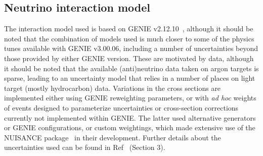 \subsection{Neutrino interaction model}
The interaction model used is based on GENIE v2.12.10~\cite{Andreopoulos:2009rq,Andreopoulos:2015wxa}, although it should be noted that the combination of models used is much closer to some of the physics tunes available with GENIE v3.00.06, including a number of uncertainties beyond those provided by either GENIE version. These are motivated by data, although it should be noted that the available (anti)neutrino data taken on argon targets is sparse, leading to an uncertainty model that relies in a number of places on light target (mostly hydrocarbon) data. Variations in the cross sections are implemented either using GENIE reweighting parameters, or with {\em ad hoc} weights of events designed to parameterize uncertainties or cross-section corrections currently not implemented within GENIE. The latter used alternative generators or GENIE configurations, or custom weightings, which made extensive use of the NUISANCE package~\cite{Stowell:2016jfr} in their development. Further details about the uncertainties used can be found in Ref~\cite{Abi:2020qib} (Section 3).

